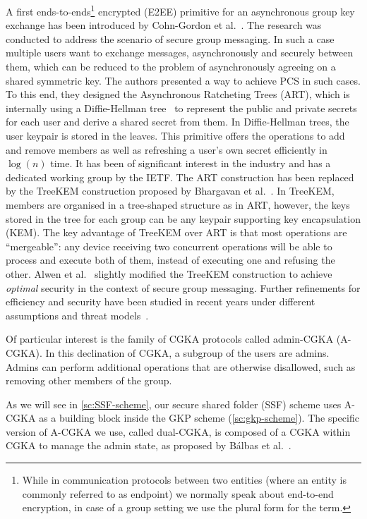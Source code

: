 A first ends-to-ends\footnote{While in communication protocols between two entities (where an entity is commonly referred to as endpoint) we normally speak about end-to-end encryption, in case of a group setting we use the plural form for the term.}
encrypted (E2EE) primitive for an asynchronous group key exchange 
has been introduced by Cohn-Gordon et al.~\cite{CCS:CCGMM18}. The research was conducted to address the scenario of secure group messaging.
In such a case multiple users want to exchange messages, asynchronously and securely
between them, which can be reduced to the problem
of asynchronously agreeing on a shared symmetric key.
The authors presented a way to achieve PCS in such cases.
To this end, they designed the Asynchronous Ratcheting Trees (ART),
which is internally using a Diffie-Hellman tree~\cite{10.1145/1368310.1368347} 
to represent the public and private secrets for each user
and derive a shared secret from them. In Diffie-Hellman
trees, the user keypair is stored in the leaves.
This primitive offers the operations to add and remove members
as well as refreshing a user's own secret efficiently in $\log(n)$ time.
It has been of significant interest in the industry and
has a dedicated working group by the IETF.
The ART construction has been replaced by the TreeKEM
construction proposed by Bhargavan et al.~\cite{TreeKEM}.
In TreeKEM, members are organised in a tree-shaped structure
as in ART, however, the keys stored in the tree for each group
can be any keypair supporting key encapsulation (KEM).
The key advantage of TreeKEM over ART is that
most operations are ``mergeable'':
any device receiving two
concurrent operations will be able to process and execute both of them,
instead of executing one and refusing the other.
Alwen et al.~\cite{C:ACDT20} slightly modified the TreeKEM construction
to achieve \textit{optimal} security in the context of
secure group messaging.
Further refinements for efficiency and security have 
been studied in recent years under different assumptions and threat models~\cite{TCC:ACJM20, SP:KPWKCCMYAP21, CCS:ACDT21, CCS:AHKM22, EC:AANKPPW22, C:AlwJosMul22, C:AlwMulTse23, IWSPA:KEONO23}.

Of particular interest is the family of CGKA protocols called admin-CGKA (A-CGKA).
In this declination of CGKA, a subgroup of the users are admins. 
Admins can perform additional operations that are otherwise disallowed, such as removing other members of the group.

As we will see in \cref{sc:SSF-scheme}, our secure shared folder (SSF) scheme uses A-CGKA as a building block
inside the GKP scheme (\cref{sc:gkp-scheme}).
The specific version of A-CGKA we use, called dual-CGKA, is composed of a CGKA within CGKA to manage the admin state, as proposed by
B{\'a}lbas et al.\!~\cite{USENIX:BalColVau23}.

